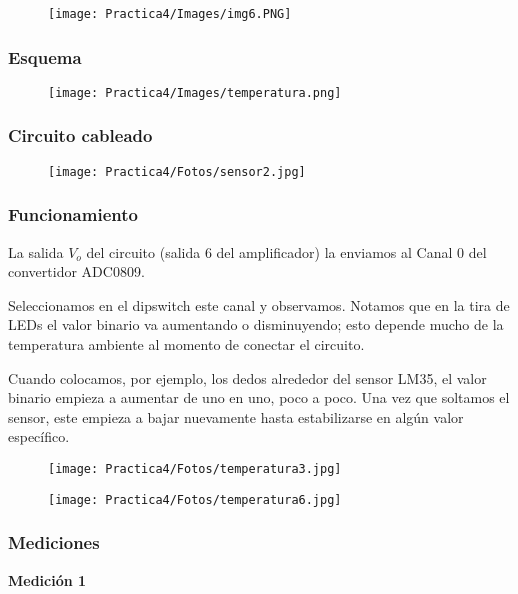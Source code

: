 \documentclass[12pt]{article}
\begin{document}
    \begin{figure}[h!]
                \centering
                \texttt{[image: Practica4/Images/img6.PNG]}
    \end{figure}
    \newpage
	\subsubsection{Esquema}
	\begin{figure}[h!]
                \centering
                \texttt{[image: Practica4/Images/temperatura.png]}
    \end{figure}
	\subsubsection{Circuito cableado}
	\begin{figure}[h!]
                \centering
                \texttt{[image: Practica4/Fotos/sensor2.jpg]}
    \end{figure}
    
	\subsubsection{Funcionamiento}
	La salida $V_{o}$ del circuito (salida 6 del amplificador) la enviamos al Canal 0 del convertidor ADC0809. 
	
	Seleccionamos en el dipswitch este canal y observamos. Notamos que en la tira de LEDs el valor binario va aumentando o disminuyendo; esto depende mucho de la temperatura ambiente al momento de conectar el circuito.
	
	Cuando colocamos, por ejemplo, los dedos alrededor del sensor LM35, el valor binario empieza a aumentar de uno en uno, poco a poco. Una vez que soltamos el sensor, este empieza a bajar nuevamente hasta estabilizarse en algún valor específico.
	
	\begin{figure}[h!]
                \centering
                \texttt{[image: Practica4/Fotos/temperatura3.jpg]}
    \end{figure}

    \begin{figure}[h!]
                \centering
                \texttt{[image: Practica4/Fotos/temperatura6.jpg]}
    \end{figure}
    \newpage
	\subsubsection{Mediciones}
    \textbf{Medición 1}
\end{document}
